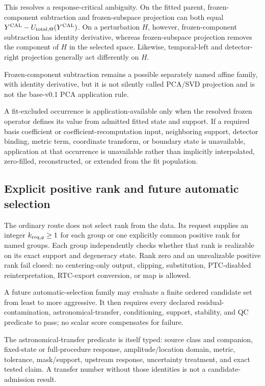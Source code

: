 \documentclass[11pt]{article}
\begin{document}
This resolves a response-critical ambiguity. On the fitted parent,
frozen-component subtraction and frozen-subspace projection can both equal
$Y^{\rm CAL}-U_{{\rm total},\Theta}(Y^{\rm CAL})$. On a perturbation $H$,
however, frozen-component
subtraction has identity derivative, whereas frozen-subspace projection
removes the component of $H$ in the selected space. Likewise, temporal-left
and detector-right projection generally act differently on $H$.

Frozen-component subtraction remains a possible separately named affine
family, with identity derivative, but it is not silently called PCA/SVD
projection and is not the base-v0.1 PCA application rule.

A fit-excluded occurrence is application-available only when the resolved
frozen operator defines its value from admitted fitted state and support. If a
required basis coefficient or coefficient-recomputation input, neighboring
support, detector binding, metric term, coordinate transform, or boundary
state is unavailable, application at that occurrence is unavailable rather
than implicitly interpolated, zero-filled, reconstructed, or extended from
the fit population.

\subsection{Explicit positive rank and future automatic selection}

The ordinary route does not select rank from the data. Its request supplies
an integer $k_{{\rm req},g}\ge1$ for each group or one explicitly common
positive rank for named groups. Each group independently checks whether that
rank is realizable on its exact support and degeneracy state. Rank zero and an
unrealizable positive rank fail closed: no centering-only output, clipping,
substitution, PTC-disabled reinterpretation, RTC-export conversion, or map is
allowed.

A future automatic-selection family may evaluate a finite ordered candidate
set from least to more aggressive. It then requires every declared
residual-contamination, astronomical-transfer, conditioning, support,
stability, and QC predicate to pass; no scalar score compensates for failure.

The astronomical-transfer predicate is itself typed: source class and
companion, fixed-state or full-procedure response, amplitude/location domain,
metric, tolerance, mask/support, upstream response, uncertainty treatment,
and exact tested claim. A transfer number without those identities is not a
candidate-admission result.
\end{document}
